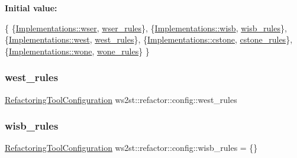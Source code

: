 {\bfseries Initial value\+:}
\begin{DoxyCode}
\{
        \{\mbox{\hyperlink{common_8hpp_aad9d1428f17c06ff77ef15dea22624dca3ea88c09708a5249b91005897ef1c7b5}{Implementations::wser}}, \mbox{\hyperlink{namespacews2st_1_1refactor_1_1config_adbf1382f32e8457bc03111d509edbca6}{wser\_rules}}\},
        \{\mbox{\hyperlink{common_8hpp_aad9d1428f17c06ff77ef15dea22624dca51ebdf65e8265412558ead76b3a2731a}{Implementations::wisb}}, \mbox{\hyperlink{namespacews2st_1_1refactor_1_1config_afdd469e55a65ac7c72071bf2e4e06029}{wisb\_rules}}\},
        \{\mbox{\hyperlink{common_8hpp_aad9d1428f17c06ff77ef15dea22624dcada4f0053a5c13882268852ae2da2e466}{Implementations::west}}, \mbox{\hyperlink{namespacews2st_1_1refactor_1_1config_a3dc95eea18c957b3983f70d23ffed2d0}{west\_rules}}\},
        \{\mbox{\hyperlink{common_8hpp_aad9d1428f17c06ff77ef15dea22624dcad4c140b283e210215c1b507247417c54}{Implementations::cstone}}, \mbox{\hyperlink{namespacews2st_1_1refactor_1_1config_acb4294be20659997c85738666c145e94}{cstone\_rules}}\},
        \{\mbox{\hyperlink{common_8hpp_aad9d1428f17c06ff77ef15dea22624dca0650d4decfd768ea852fe73e3c206a1a}{Implementations::wone}}, \mbox{\hyperlink{namespacews2st_1_1refactor_1_1config_a47b29102072b952b56dc5746d166da8c}{wone\_rules}}\}
    \}
\end{DoxyCode}
\mbox{\label{namespacews2st_1_1refactor_1_1config_a3dc95eea18c957b3983f70d23ffed2d0}} 
\subsubsection{\texorpdfstring{west\+\_\+rules}{west\_rules}}
{\footnotesize\ttfamily \mbox{\hyperlink{classws2st_1_1refactor_1_1RefactoringToolConfiguration}{Refactoring\+Tool\+Configuration}} ws2st\+::refactor\+::config\+::west\+\_\+rules}

\mbox{\label{namespacews2st_1_1refactor_1_1config_afdd469e55a65ac7c72071bf2e4e06029}} 
\subsubsection{\texorpdfstring{wisb\+\_\+rules}{wisb\_rules}}
{\footnotesize\ttfamily \mbox{\hyperlink{classws2st_1_1refactor_1_1RefactoringToolConfiguration}{Refactoring\+Tool\+Configuration}} ws2st\+::refactor\+::config\+::wisb\+\_\+rules = \{\}}

